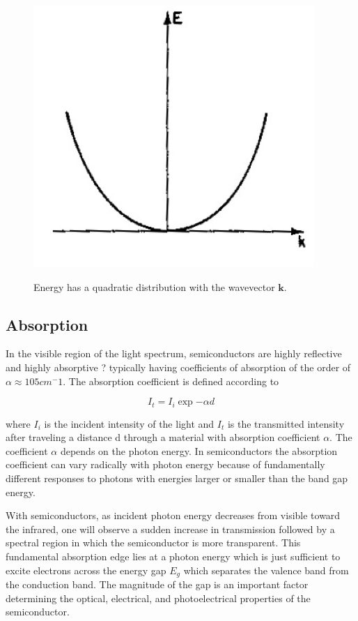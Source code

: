 \documentclass{article}
\renewcommand{\vec}[1]{\mathbf{#1}}
\begin{document}
\begin{figure}[!htb]
	\centering
	\includegraphics[scale=1.]{plots/fig_3.png}
 	\label{quadratic}
	\caption{Energy has a quadratic distribution with the wavevector $\vec{k}$.\cite{lab manual}}
\end{figure}

\subsection{Absorption}

In the visible region of the light spectrum, semiconductors are highly reflective  and highly absorptive ? typically having coefficients of absorption of the order of $\alpha \approx 105 cm^-1$.
The absorption coefficient is defined according to

\begin{equation}
	I_t = I_i \exp{-\alpha d}
\end{equation}

where $I_i$ is the incident intensity of the light and $I_t$ is the transmitted intensity after traveling a distance d through a material with absorption coefficient $\alpha$. The coefficient $\alpha$ depends on the photon energy. In semiconductors the absorption coefficient can vary radically with photon energy because of fundamentally different responses to photons with energies larger or smaller than the band gap energy.\cite{lab manual}

\hspace{.25cm}

With semiconductors, as incident photon energy decreases from visible toward the infrared, one will observe a sudden increase in transmission followed by a spectral region in which the semiconductor is more transparent. This fundamental absorption edge lies at a photon energy which is just sufficient to excite electrons across the energy gap $E_g$ which separates the valence band from the conduction band. The magnitude of the gap is an important factor determining the optical, electrical, and photoelectrical properties of the semiconductor.
\end{document}
